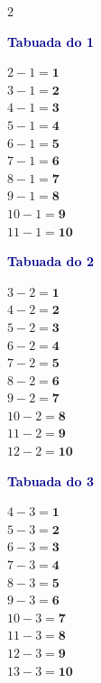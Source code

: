 \documentclass[12pt]{article}
\begin{document}
\begin{multicols}{2}

\end{multicols}

\vspace{4pt}


\vspace{6pt}\noindent
\begin{minipage}[t]{3.3cm}
\noindent\textcolor{darkblue}{\bfseries\small Tabuada do 1}\par\vspace{2pt}
{\footnotesize
$2-1=\mathbf{1}$\\$3-1=\mathbf{2}$\\$4-1=\mathbf{3}$\\
$5-1=\mathbf{4}$\\$6-1=\mathbf{5}$\\$7-1=\mathbf{6}$\\
$8-1=\mathbf{7}$\\$9-1=\mathbf{8}$\\$10-1=\mathbf{9}$\\
$11-1=\mathbf{10}$}
\end{minipage}\hfill
\begin{minipage}[t]{3.3cm}
\noindent\textcolor{darkblue}{\bfseries\small Tabuada do 2}\par\vspace{2pt}
{\footnotesize
$3-2=\mathbf{1}$\\$4-2=\mathbf{2}$\\$5-2=\mathbf{3}$\\
$6-2=\mathbf{4}$\\$7-2=\mathbf{5}$\\$8-2=\mathbf{6}$\\
$9-2=\mathbf{7}$\\$10-2=\mathbf{8}$\\$11-2=\mathbf{9}$\\
$12-2=\mathbf{10}$}
\end{minipage}\hfill
\begin{minipage}[t]{3.3cm}
\noindent\textcolor{darkblue}{\bfseries\small Tabuada do 3}\par\vspace{2pt}
{\footnotesize
$4-3=\mathbf{1}$\\$5-3=\mathbf{2}$\\$6-3=\mathbf{3}$\\
$7-3=\mathbf{4}$\\$8-3=\mathbf{5}$\\$9-3=\mathbf{6}$\\
$10-3=\mathbf{7}$\\$11-3=\mathbf{8}$\\$12-3=\mathbf{9}$\\
$13-3=\mathbf{10}$}
\end{minipage}\hfill
\end{document}
